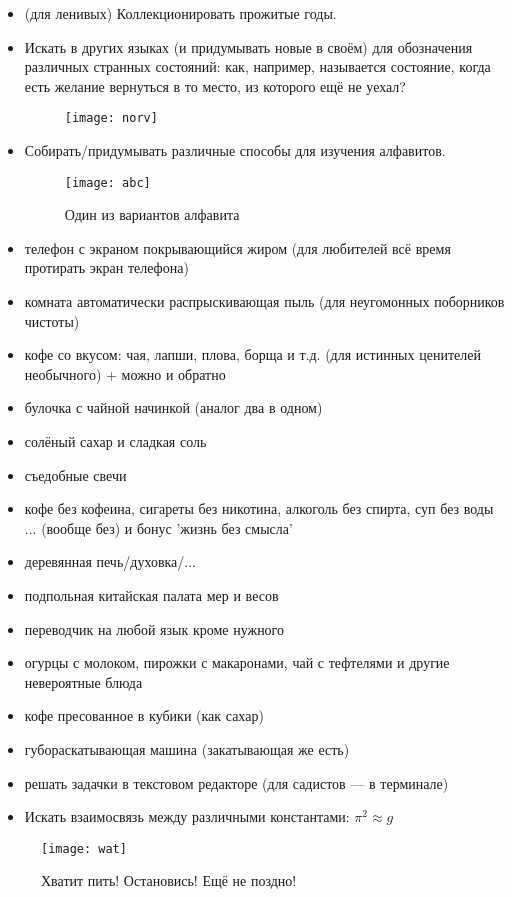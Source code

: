 \begin{itemize}
    \item (для ленивых) Коллекционировать прожитые годы.
    \item Искать в других языках (и придумывать новые в своём) для обозначения различных странных состояний: как, например, называется состояние, когда есть желание вернуться в то место, из которого ещё не уехал?
    \begin{figure}[ht!]
        \centering
        \texttt{[image: norv]}
    \end{figure}
    
    \item Собирать/придумывать различные способы для изучения алфавитов.
    
    \begin{figure}[ht!]
        \centering
        \texttt{[image: abc]}
        \caption{Один из вариантов алфавита}
    \end{figure}
    
    \item телефон с экраном покрывающийся жиром (для любителей всё время протирать экран телефона)
    \item комната автоматически распрыскивающая пыль (для неугомонных поборников чистоты)
    \item кофе со вкусом: чая, лапши, плова, борща и т.д. (для истинных ценителей необычного) + можно и обратно
    \item булочка с чайной начинкой (аналог два в одном)
    \item солёный сахар и сладкая соль
    \item съедобные свечи
    \item кофе без кофеина, сигареты без никотина, алкоголь без спирта, суп без воды ... (вообще без) и бонус 'жизнь без смысла'
    \item деревянная печь/духовка/...
    \item подпольная китайская палата мер и весов
    \item переводчик на любой язык кроме нужного
    \item огурцы с молоком, пирожки с макаронами, чай с тефтелями и другие невероятные блюда
    \item кофе пресованное в кубики (как сахар)
    \item губораскатывающая машина (закатывающая же есть)
    \item решать задачки в текстовом редакторе (для садистов --- в терминале)
    \item Искать взаимосвязь между различными константами: $\pi^2 \approx g$ %
\end{itemize}
\begin{figure}[ht!]
    \centering
    \texttt{[image: wat]}
    \caption{Хватит пить! Остановись! Ещё не поздно!}
\end{figure}
